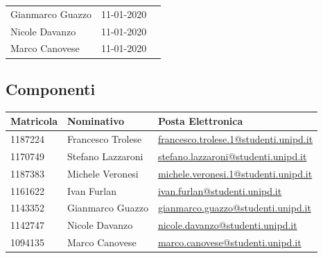\begin{center}
\begin{longtable}{p{4cm}|p{4cm}|p{6cm}}
		\newline Gianmarco Guazzo  & 11-01-2020 & \newline \newline \\
		\newline Nicole Davanzo    & 11-01-2020 & \newline \newline \\
		\newline Marco Canovese    & 11-01-2020 & \newline \newline \\
	\end{longtable}
\end{center}

\subsection{Componenti}
\begin{center}

	\begin{longtable}{p{4cm}|p{4cm}|p{6cm}}
		\arrayrulecolor{white}
		\hline
		\rowcolor{lighter-grayer}
		\textbf{Matricola}  &
		\textbf{Nominativo} &
		\textbf{Posta Elettronica}                                              \\
		\hline
		1187224             & Francesco Trolese & \href{mailto:francesco.trolese.1@studenti.unipd.it}{francesco.trolese.1@studenti.unipd.it} \\
		1170749             & Stefano Lazzaroni & \href{mailto:stefano.lazzaroni@studenti.unipd.it}{stefano.lazzaroni@studenti.unipd.it} \\
		1187383             & Michele Veronesi  & \href{mailto:michele.veronesi.1@studenti.unipd.it}{michele.veronesi.1@studenti.unipd.it}\\
		1161622             & Ivan Furlan       & \href{mailto:ivan.furlan@studenti.unipd.it}{ivan.furlan@studenti.unipd.it} \\
		1143352             & Gianmarco Guazzo  & \href{mailto:gianmarco.guazzo@studenti.unipd.it}{gianmarco.guazzo@studenti.unipd.it} \\
		1142747             & Nicole Davanzo    & \href{mailto:nicole.davanzo@studenti.unipd.it}{nicole.davanzo@studenti.unipd.it} \\
		1094135             & Marco Canovese    & \href{mailto:marco.canovese@studenti.unipd.it}{marco.canovese@studenti.unipd.it} \\
	\end{longtable}
\end{center}

